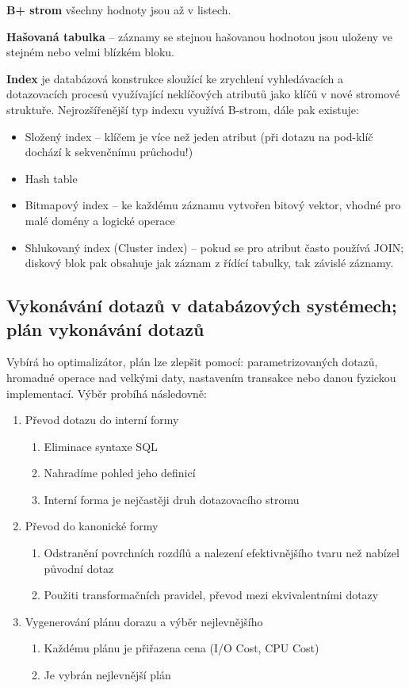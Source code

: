 \textbf{B+ strom} všechny hodnoty jsou až v listech.

\textbf{Hašovaná tabulka} -- záznamy se stejnou hašovanou hodnotou jsou uloženy ve stejném nebo velmi blízkém bloku.

\textbf{Index} je databázová konstrukce sloužící ke zrychlení vyhledávacích a dotazovacích procesů využívající neklíčových atributů jako klíčů v nové stromové struktuře. Nejrozšířenější typ indexu využívá B-strom, dále pak existuje:
\begin{itemize}
\item Složený index – klíčem je více než jeden atribut (při dotazu na pod-klíč dochází k sekvenčnímu průchodu!)
\item Hash table
\item Bitmapový index – ke každému záznamu vytvořen bitový vektor, vhodné pro malé domény a logické operace
\item Shlukovaný index (Cluster index) – pokud se pro atribut často používá JOIN; diskový blok pak obsahuje jak záznam z řídící tabulky, tak závislé záznamy.
\end{itemize}
\subsection{Vykonávání dotazů v databázových systémech; plán vykonávání dotazů}
Vybírá ho optimalizátor, plán lze zlepšit pomocí: parametrizovaných dotazů, hromadné operace nad velkými daty, nastavením transakce nebo danou fyzickou implementací. Výběr probíhá následovně:
\begin{enumerate}
\item Převod dotazu do interní formy
	\begin{enumerate}
	\item Eliminace syntaxe SQL
	\item Nahradíme pohled jeho definicí
	\item Interní forma je nejčastěji druh dotazovacího stromu
	\end{enumerate}
\item Převod do kanonické formy
	\begin{enumerate}
	\item Odstranění povrchních rozdílů a nalezení efektivnějšího tvaru než nabízel původní dotaz
	\item Použiti transformačních pravidel, převod mezi ekvivalentními dotazy
	\end{enumerate}
\item Vygenerování plánu dorazu a výběr nejlevnějšího
	\begin{enumerate}
	\item Každému plánu je přiřazena cena (I/O Cost, CPU Cost)
	\item Je vybrán nejlevnější plán
	\end{enumerate}
\end{enumerate}

